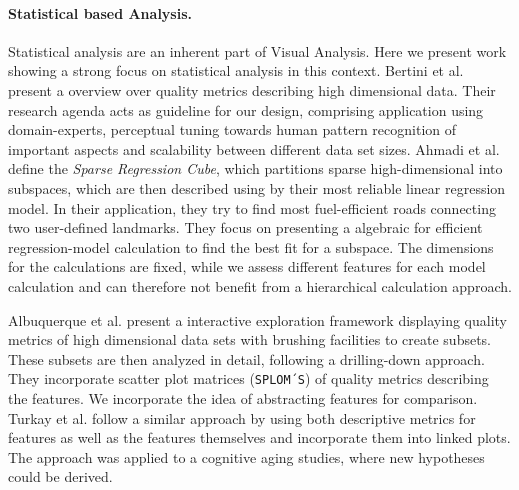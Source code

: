 \documentclass[journal]{style/vgtc} 			          %
\begin{document}
\paragraph{Statistical based Analysis.}
Statistical analysis are an inherent part of Visual Analysis.
Here we present work showing a strong focus on statistical analysis in this context.
Bertini et al. \cite{Bertini} present a overview over quality metrics describing high dimensional data.
Their research agenda acts as guideline for our design, comprising application using domain-experts, perceptual tuning towards human pattern recognition of important aspects and scalability between different data set sizes.
Ahmadi et al. \cite{Ahmadi} define the \emph{Sparse Regression Cube}, which partitions sparse high-dimensional into subspaces, which are then described using by their most reliable linear regression model.
In their application, they try to find most fuel-efficient roads connecting two user-defined landmarks.
They focus on presenting a algebraic for efficient regression-model calculation to find the best fit for a subspace.
The dimensions for the calculations are fixed, while we assess different features for each model calculation and can therefore not benefit from a hierarchical calculation approach.

Albuquerque et al. \cite{Albuquerque} present a interactive exploration framework displaying quality metrics of high dimensional data sets with brushing facilities to create subsets.
These subsets are then analyzed in detail, following a drilling-down approach.
They incorporate scatter plot matrices (\texttt{SPLOM´S}) of quality metrics describing the features.
We incorporate the idea of abstracting features for comparison.
Turkay et al. \cite{Turkay} follow a similar approach by using both descriptive metrics for features as well as the features themselves and incorporate them into linked plots.
The approach was applied to a cognitive aging studies, where new hypotheses could be derived.
\end{document}
